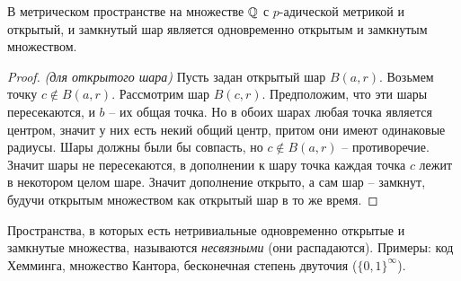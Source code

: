 \documentclass[../main.tex]{subfiles}
\begin{document}
	\begin{statement}
		В метрическом пространстве на множестве $\mathbb{Q}$ с $p$-адической метрикой и открытый, и замкнутый шар является одновременно открытым и замкнутым множеством.
	\end{statement}
	\begin{proof}
		\textit{(для открытого шара)} Пусть задан открытый шар $B(a, r)$. Возьмем точку $c\notin B(a, r)$. Рассмотрим шар $B(c, r)$. Предположим, что эти шары пересекаются, и $b$ -- их общая точка. Но в обоих шарах любая точка является центром, значит у них есть некий общий центр, притом они имеют одинаковые радиусы. Шары должны были бы совпасть, но $c\notin B(a, r)$ -- противоречие. Значит шары не пересекаются, в дополнении к шару точка каждая точка $c$ лежит в некотором целом шаре. Значит дополнение открыто, а сам шар -- замкнут, будучи открытым множеством как открытый шар в то же время.
	\end{proof}

	\begin{definition}
		Пространства, в которых есть нетривиальные одновременно открытые и замкнутые множества, называются \textit{несвязными} (они распадаются). Примеры: код Хемминга, множество Кантора, бесконечная степень двуточия ($\{0, 1\}^{\infty}$). 
	\end{definition}
\end{document}
